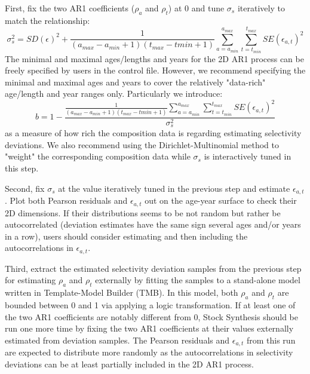 First, fix the two AR1 coefficients ($\rho_a$ and $\rho_t$) at 0 and tune $\sigma_s$ iteratively to match the relationship:
	\begin{equation}
		\sigma_s^2=SD(\epsilon)^2+\frac{1}{(a_{max}-a_{min}+1)(t_{max}-t{min}+1)}\sum_{a=a_{min}}^{a_{max}}\sum_{t=t_{min}}^{t_{max}}SE(\epsilon_{a,t})^2
	\end{equation}
The minimal and maximal ages/lengths and years for the 2D AR1 process can be freely specified by users in the control file. However, we recommend specifying the minimal and maximal ages and years to cover the relatively "data-rich" age/length and year ranges only. Particularly we introduce: 
	\begin{equation}
		b=1-\frac{\frac{1}{(a_{max}-a_{min}+1)(t_{max}-t{min}+1)}\sum_{a=a_{min}}^{a_{max}}\sum_{t=t_{min}}^{t_{max}}SE(\epsilon_{a,t})^2}{\sigma_s^2}
	\end{equation}
as a measure of how rich the composition data is regarding estimating selectivity deviations. We also recommend using the Dirichlet-Multinomial method to "weight" the corresponding composition data while $\sigma_s$ is interactively tuned in this step.
	
Second, fix $\sigma_s$ at the value iteratively tuned in the previous step and estimate $\epsilon_{a,t}$. Plot both Pearson residuals and $\epsilon_{a,t}$ out on the age-year surface to check their 2D dimensions. If their distributions seems to be not random but rather be autocorrelated (deviation estimates have the same sign several ages and/or years in a row), users should consider estimating and then including the autocorrelations in $\epsilon_{a,t}$.

Third, extract the estimated selectivity deviation samples from the previous step for estimating $\rho_a$ and $\rho_t$ externally by fitting the samples to a stand-alone model written in Template-Model Builder (TMB). In this model, both $\rho_a$ and $\rho_t$ are bounded between 0 and 1 via applying a logic transformation. If at least one of the two AR1 coefficients are notably different from 0, Stock Synthesis should be run one more time by fixing the two AR1 coefficients at their values externally estimated from deviation samples. The Pearson residuals and $\epsilon_{a,t}$ from this run are expected to distribute more randomly as the  autocorrelations in selectivity deviations can be at least partially included in the 2D AR1 process.



